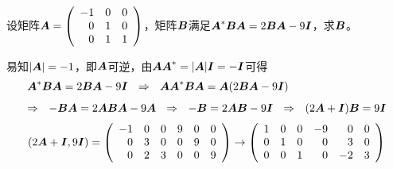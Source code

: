 \begin{frame}

\begin{li}[2012-2013第二学期]
设矩阵$\MA=\left(
\begin{array}{rrr}
-1&0&0\\
 0&1&0\\
 0&1&1
\end{array}
\right)$，矩阵$\MB$满足$\MA^*\MB\MA=2\MB\MA-9\MI$，求$\MB$。
\end{li}
\pause

\begin{jie}
易知$|\MA|=-1$，即$\MA$可逆，由$\MA\MA^*=|\MA|\MI=-\MI$可得
$$
\begin{array}{l}
\MA^*\MB\MA=2\MB\MA-9\MI ~~\Rightarrow~~
\MA\MA^*\MB\MA=\MA(2\MB\MA-9\MI) \\[0.1in]
\Rightarrow~~
-\MB\MA=2\MA\MB\MA-9\MA ~~\Rightarrow~~
-\MB=2\MA\MB-9\MI   ~~\Rightarrow~~
(2\MA+\MI)\MB=9\MI
\end{array}
$$
$$
\begin{array}{l}
(2\MA+\MI, 9\MI)=\left(
\begin{array}{rrrrrr}
  -1   &  0  &   0 &  9&0&0\\
  0    & 3   &  0  &  0&9&0\\
  0    & 2   &  3  &  0&0&9
\end{array}
\right)  \rightarrow
\left(
\begin{array}{rrrrrr}
  1   &  0  &   0 & -9&0&0\\
  0    & 1   &  0  &  0&3&0\\
  0    & 0   &  1  &  0&-2&3
\end{array}
\right)  
\end{array}
$$
\end{jie}
\end{frame}

